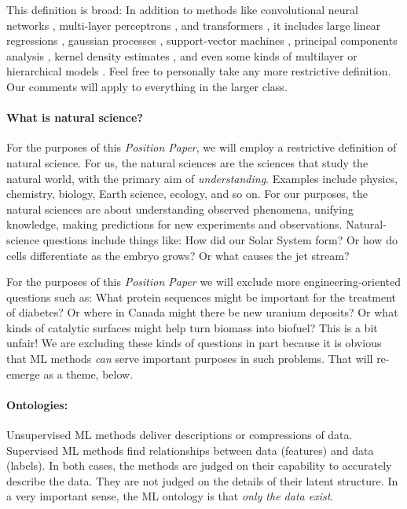 \documentclass[10pt]{article}
\newcommand{\documentname}{\textsl{Position Paper}}
\begin{document}
This definition is broad:
In addition to methods like convolutional neural networks \cite{cnn}, multi-layer perceptrons \cite{mlp}, and transformers \cite{transformer}, it includes large linear regressions \cite{linearregression}, gaussian processes \cite{gp}, support-vector machines \cite{svm}, principal components analysis \cite{pca}, kernel density estimates \cite{kde}, and even some kinds of multilayer or hierarchical models \cite{multilevel}.
Feel free to personally take any more restrictive definition.
Our comments will apply to everything in the larger class.

\paragraph{What is natural science?}
For the purposes of this \documentname, we will employ a restrictive definition of natural science.
For us, the natural sciences are the sciences that study the natural world, with the primary aim of \emph{understanding}.
Examples include physics, chemistry, biology, Earth science, ecology, and so on.
For our purposes, the natural sciences are about understanding observed phenomena, unifying knowledge, making predictions for new experiments and observations.
Natural-science questions include things like: How did our Solar System form? Or how do cells differentiate as the embryo grows? Or what causes the jet stream?

For the purposes of this \documentname{} we will exclude more engineering-oriented questions such as: What protein sequences might be important for the treatment of diabetes? Or where in Canada might there be new uranium deposits? Or what kinds of catalytic surfaces might help turn biomass into biofuel?
This is a bit unfair!
We are excluding these kinds of questions in part because it is obvious that ML methods \emph{can} serve important purposes in such problems.
That will re-emerge as a theme, below.

\paragraph{Ontologies:}
Unsupervised ML methods deliver descriptions or compressions of data.
Supervised ML methods find relationships between data (features) and data (labels).
In both cases, the methods are judged on their capability to accurately describe the data.
They are not judged on the details of their latent structure.
In a very important sense, the ML ontology is that \emph{only the data exist}.
\end{document}
